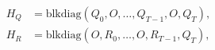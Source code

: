 \documentclass[letterpaper, 10 pt, conference]{ieeeconf}
\newcommand{\blockDiag}{\text{blkdiag}}
\newcommand{\?}{\stackrel{?}{=}}
\newcommand{\param}{\theta}
\newcommand{\LQRHorizon}{T}
\newcommand{\zero}{\textbf{0}}
\newcommand{\LQRStateCost}{Q}
\newcommand{\LQRControlCost}{R}
\newcommand{\LQRStateDyn}{A}
\newcommand{\LQRControlDyn}{B}
\newcommand{\antoine}[1]{{\textcolor[rgb]{1,0,0}{\textsf{[Antoine: {#1}]}}}}
\newcommand{\brendan}[1]{{\textcolor[rgb]{1,0,1}{\textsf{[Brendan: {#1}]}}}}
\begin{document}
{
\setlength{\abovedisplayskip}{3.5pt}
\setlength{\belowdisplayskip}{3.5pt}
\begin{align*}
    H_\LQRStateCost &= \blockDiag(\LQRStateCost_0, O, \ldots, \LQRStateCost_{\LQRHorizon-1}, O, \LQRStateCost_{\LQRHorizon}), \\
    H_\LQRControlCost &= \blockDiag(O, \LQRControlCost_0, \ldots, O, \LQRControlCost_{\LQRHorizon-1}, \LQRStateCost_{\LQRHorizon}), %
\end{align*}
}
\end{document}
